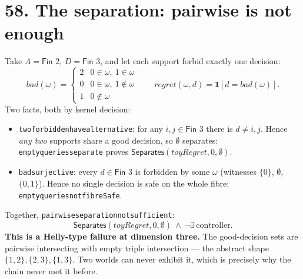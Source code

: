 \documentclass[9pt,twocolumn]{article}
\renewcommand{\_}{\CIGunderscore\allowbreak}
\begin{document}
\section*{58. The separation: pairwise is not enough}
Take $A=\textsf{Fin }2$, $D=\textsf{Fin }3$, and let each support forbid exactly one decision:
\[\textit{bad}(\omega)=\begin{cases}2 & 0\in\omega,\ 1\in\omega\\ 0 & 0\in\omega,\ 1\notin\omega\\ 1 & 0\notin\omega\end{cases}\qquad
\textit{regret}(\omega,d)=\mathbf{1}[d=\textit{bad}(\omega)].\]
Two facts, both by kernel decision:
\begin{itemize}
\item \texttt{two\_forbidden\_have\_alternative}: for any $i,j\in\textsf{Fin }3$ there is $d\ne i,j$. Hence \emph{any two} supports share a good decision, so $\emptyset$ separates: \texttt{empty\_queries\_separate} proves $\textsf{Separates}(\textit{toyRegret},0,\emptyset)$.
\item \texttt{bad\_surjective}: every $d\in\textsf{Fin }3$ is forbidden by some $\omega$ (witnesses $\{0\}$, $\emptyset$, $\{0,1\}$). Hence no single decision is safe on the whole fibre: \texttt{empty\_queries\_not\_fibreSafe}.
\end{itemize}
Together, \texttt{pairwise\_separation\_not\_sufficient}:
\[\textsf{Separates}(\textit{toyRegret},0,\emptyset)\ \wedge\ \neg\exists\,\text{controller}. \]
\textbf{This is a Helly-type failure at dimension three.} The good-decision sets are pairwise intersecting with empty triple intersection --- the abstract shape $\{1,2\},\{2,3\},\{1,3\}$. Two worlds can never exhibit it, which is precisely why the chain never met it before.
\end{document}
